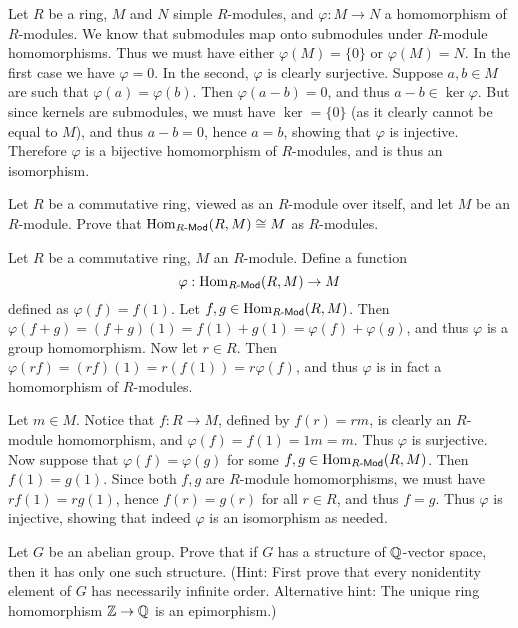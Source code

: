 \begin{solution}
	Let $R$ be a ring, $M$ and $N$ simple $R$-modules, and $\varphi: M \to N$ a homomorphism of $R$-modules. We know that submodules map onto submodules under $R$-module homomorphisms. Thus we must have either $\varphi(M) = \{0\}$ or $\varphi(M) = N$. In the first case we have $\varphi = 0$. In the second, $\varphi$ is clearly surjective. Suppose $a, b \in M$ are such that $\varphi(a) = \varphi(b)$. Then $\varphi(a - b) = 0$, and thus $a - b \in \ker \varphi$. But since kernels are submodules, we must have $\ker = \{0\}$ (as it clearly cannot be equal to $M$), and thus $a - b = 0$, hence $a = b$, showing that $\varphi$ is injective. Therefore $\varphi$ is a bijective homomorphism of $R$-modules, and is thus an isomorphism.
\end{solution}

\begin{problem}
	Let $R$ be a commutative ring, viewed as an $R$-module over itself, and let $M$ be an $R$-module. Prove that $\mathrm{Hom}_{R\text{-}\mathsf{Mod}}(R, M) \cong M$ as $R$-modules.
\end{problem}

\begin{solution}
	Let $R$ be a commutative ring, $M$ an $R$-module. Define a function
	\[
		\varphi: \mathrm{Hom}_{R\text{-}\mathsf{Mod}}(R, M) \to M
	\]
	defined as $\varphi(f) = f(1)$. Let $f, g \in \mathrm{Hom}_{R\text{-}\mathsf{Mod}}(R, M)$. Then $\varphi(f + g) = (f + g)(1) = f(1) + g(1) = \varphi(f) + \varphi(g)$, and thus $\varphi$ is a group homomorphism. Now let $r \in R$. Then $\varphi(rf) = (rf)(1) = r(f(1)) = r \varphi(f)$, and thus $\varphi$ is in fact a homomorphism of $R$-modules.
	
	Let $m \in M$. Notice that $f: R \to M$, defined by $f(r) = rm$, is clearly an $R$-module homomorphism, and $\varphi(f) = f(1) = 1m = m$. Thus $\varphi$ is surjective. Now suppose that $\varphi(f) = \varphi(g)$ for some $f, g \in \mathrm{Hom}_{R\text{-}\mathsf{Mod}}(R, M)$. Then $f(1) = g(1)$. Since both $f, g$ are $R$-module homomorphisms, we must have $rf(1) = rg(1)$, hence $f(r) = g(r)$ for all $r \in R$, and thus $f = g$. Thus $\varphi$ is injective, showing that indeed $\varphi$ is an isomorphism as needed.
\end{solution}

\begin{problem}
	Let $G$ be an abelian group. Prove that if $G$ has a structure of $\mathbb{Q}$-vector space, then it has only one such structure. (Hint: First prove that every nonidentity element of $G$ has necessarily infinite order. Alternative hint: The unique ring homomorphism $\mathbb{Z} \to \mathbb{Q}$ is an epimorphism.)
\end{problem}

